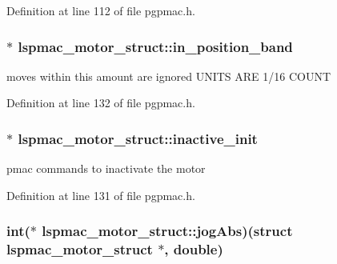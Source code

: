 Definition at line 112 of file pgpmac.\-h.

\hypertarget{structlspmac__motor__struct_a48de72c2442bd5aa9420fcfe6b4f265f}{
\subsubsection[{in\-\_\-position\-\_\-band}]{$\ast$ lspmac\-\_\-motor\-\_\-struct\-::in\-\_\-position\-\_\-band}}\label{structlspmac__motor__struct_a48de72c2442bd5aa9420fcfe6b4f265f}


moves within this amount are ignored U\-N\-I\-T\-S A\-R\-E 1/16 C\-O\-U\-N\-T 



Definition at line 132 of file pgpmac.\-h.

\hypertarget{structlspmac__motor__struct_ab329ce9b277eca9984c18417dece7bf7}{
\subsubsection[{inactive\-\_\-init}]{$\ast$ lspmac\-\_\-motor\-\_\-struct\-::inactive\-\_\-init}}\label{structlspmac__motor__struct_ab329ce9b277eca9984c18417dece7bf7}


pmac commands to inactivate the motor 



Definition at line 131 of file pgpmac.\-h.

\hypertarget{structlspmac__motor__struct_a86380d221e4b17eb8cf87a5ac656b669}{
\subsubsection[{jog\-Abs}]{\setlength{\rightskip}{0pt plus 5cm}int($\ast$ lspmac\-\_\-motor\-\_\-struct\-::jog\-Abs)(struct {\bf lspmac\-\_\-motor\-\_\-struct} $\ast$, double)}}\label{structlspmac__motor__struct_a86380d221e4b17eb8cf87a5ac656b669}


